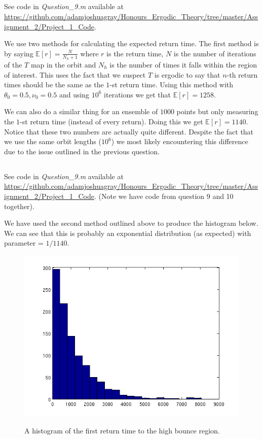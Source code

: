 \documentclass{unswmaths}
\begin{document}
\subsection{}
See code in \emph{Question\_9.m} available at \url{https://github.com/adamjoshuagray/Honours_Ergodic_Theory/tree/master/Assignment_2/Project_1_Code}.


We use two methods for calculating the expected return time. The first method is by saying $ \mathbb{E}[r] = \frac{N}{N_h + 1}$ where $ r $ is the return time, $ N $ is the number of iterations of the $ T $ map in the orbit and $ N_h $ is the number of times it falls within the region of interest. This uses the fact that we suspect $ T $ is ergodic to say that $ n$-th return times should be the same as the $ 1$-st return time.
Using this method with $ \theta_0 = 0.5, \nu_0 = 0.5 $ and using $ 10^6 $ iterations we get that $ \mathbb{E}[ r] = 1258 $.

We can also do a similar thing for an ensemble of $ 1000 $ points but only measuring the $1$-st return time (instead of every return). Doing this we get $ \mathbb{E}[r] = 1140 $. Notice that these two numbers are actually quite different. Despite the fact that we use the same orbit lengths ($10^6$) we most likely encountering this difference due to the issue outlined in the previous question.

\subsection{}

See code in \emph{Question\_9.m} available at \url{https://github.com/adamjoshuagray/Honours_Ergodic_Theory/tree/master/Assignment_2/Project_1_Code}. (Note we have code from question 9 and 10 together).

We have used the second method outlined above to produce the histogram below. We can see that this is probably an exponential distribution (as expected) with parameter = $ 1 / 1140 $.
\begin{figure}[h]
    \includegraphics[scale=0.5]{Return_Histogram}
    \label{Histogram}
    \caption{A histogram of the first return time to the high bounce region. }
\end{figure}
\end{document}
